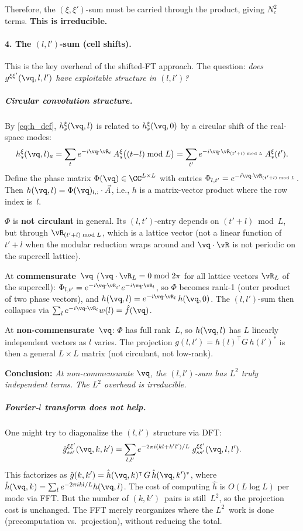 Therefore, the $(\xi,\xi')$-sum must be carried through the product,
giving $N_c^2$ terms.  \textbf{This is irreducible.}


\paragraph{4. The $(l, l')$-sum (cell shifts).}

This is the key overhead of the shifted-FT approach.
The question: \emph{does $g^{\xi\xi'}(\vq, l, l')$ have
exploitable structure in $(l, l')$?}

\subparagraph{Circular convolution structure.}
By \cref{eq:h_def}, $h_s^\xi(\vq, l)$ is related to $h_s^\xi(\vq, 0)$
by a circular shift of the real-space modes:
\begin{equation}\label{eq:h_shift}
  h_s^\xi(\vq, l)_a
  = \sum_t e^{-i\vq\cdot\vR_t}\, A_s^\xi\bigl((t{-}l)\bmod L\bigr)
  = \sum_{t'} e^{-i\vq\cdot\vR_{(t'+l)\bmod L}}\, A_s^\xi(t').
\end{equation}
Define the phase matrix $\Phi(\vq) \in \CC^{L\times L}$ with entries
$\Phi_{l,t'} = e^{-i\vq\cdot\vR_{(t'+l)\bmod L}}$.  Then
$h(\vq, l) = \Phi(\vq)_{l,:} \cdot \vec{A}$, i.e., $h$ is a
matrix-vector product where the row index is~$l$.

$\Phi$ is \textbf{not circulant} in general.
Its $(l, t')$-entry depends on $(t' + l) \bmod L$, but through
$\vR_{(t'+l)\bmod L}$, which is a lattice vector (not a linear
function of $t'+l$ when the modular reduction wraps around and
$\vq\cdot\vR$ is not periodic on the supercell lattice).

At \textbf{commensurate}~$\vq$ ($\vq\cdot\vR_L = 0 \bmod 2\pi$
for all lattice vectors $\vR_L$ of the supercell):
$\Phi_{l,t'} = e^{-i\vq\cdot\vR_{t'}} e^{-i\vq\cdot\vR_l}$,
so $\Phi$ becomes rank-1 (outer product of two phase vectors),
and $h(\vq, l) = e^{-i\vq\cdot\vR_l}\, h(\vq, 0)$.
The $(l,l')$-sum then collapses via $\sum_l e^{-i\vq\cdot\vR_l} w(l)
= \hat{f}(\vq)$.

At \textbf{non-commensurate}~$\vq$: $\Phi$ has full rank~$L$, so
$h(\vq, l)$ has $L$ linearly independent vectors as $l$ varies.
The projection $g(l, l') = h(l)^\intercal G\, h(l')^*$ is then a
general $L\times L$ matrix (not circulant, not low-rank).

\textbf{Conclusion:} \emph{At non-commensurate $\vq$, the $(l,l')$-sum
has $L^2$ truly independent terms.  The $L^2$ overhead is irreducible.}


\subparagraph{Fourier-$l$ transform does not help.}
One might try to diagonalize the $(l,l')$ structure via DFT:
\begin{equation}
  \hat{g}_{ss'}^{\xi\xi'}(\vq, k, k')
  = \sum_{l,l'} e^{-2\pi i(kl + k'l')/L}\;
    g_{ss'}^{\xi\xi'}(\vq, l, l').
\end{equation}
This factorizes as
$\hat{g}(k, k') = \hat{h}(\vq, k)^\intercal\, G\, \hat{h}(\vq, k')^*$,
where $\hat{h}(\vq, k) = \sum_l e^{-2\pi ikl/L} h(\vq, l)$.
The cost of computing $\hat{h}$ is $O(L \log L)$ per mode via FFT.
But the number of $(k, k')$~pairs is still~$L^2$, so the
projection cost is unchanged.  The FFT merely reorganizes where
the $L^2$~work is done (precomputation vs.\ projection), without
reducing the total.


